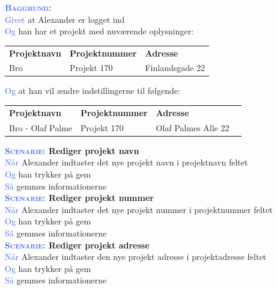 \textsc{\textcolor{RoyalBlue}{\textbf{Baggrund:}}}\\
\textcolor{RoyalBlue}{Givet} at Alexander er logget ind\\
\textcolor{RoyalBlue}{Og} han har et projekt med nuværende oplysninger:\\
\begin{tabular}{| l | l | l |}
	\textbf{Projektnavn} & \textbf{Projektnummer} & \textbf{Adresse} \\
	Bro & Projekt 170 & Finlandsgade 22 \\
\end{tabular}
\newline \newline
\textcolor{RoyalBlue}{Og} at han vil ændre indstillingerne til følgende:\\
\begin{tabular}{| l | l | l | l |}
	\textbf{Projektnavn} & \textbf{Projektnummer} & \textbf{Adresse} \\
	Bro - Olaf Palme & Projekt 170 & Olaf Palmes Alle 22 \\
\end{tabular}
\newline

\textbf{\textsc{\textcolor{RoyalBlue}{Scenarie:}} Rediger projekt navn}\\
\textcolor{RoyalBlue}{Når} Alexander indtaster det nye projekt navn i projektnavn feltet\\
\textcolor{RoyalBlue}{Og} han trykker på gem \\
\textcolor{RoyalBlue}{Så} gemmes informationerne \\

\textbf{\textsc{\textcolor{RoyalBlue}{Scenarie:}} Rediger projekt nummer}\\
\textcolor{RoyalBlue}{Når} Alexander indtaster det nye projekt nummer i projektnummer feltet\\
\textcolor{RoyalBlue}{Og} han trykker på gem \\
\textcolor{RoyalBlue}{Så} gemmes informationerne \\

\textbf{\textsc{\textcolor{RoyalBlue}{Scenarie:}} Rediger projekt adresse}\\
\textcolor{RoyalBlue}{Når} Alexander indtaster den nye projekt adresse i projektadresse feltet\\
\textcolor{RoyalBlue}{Og} han trykker på gem \\
\textcolor{RoyalBlue}{Så} gemmes informationerne \\

